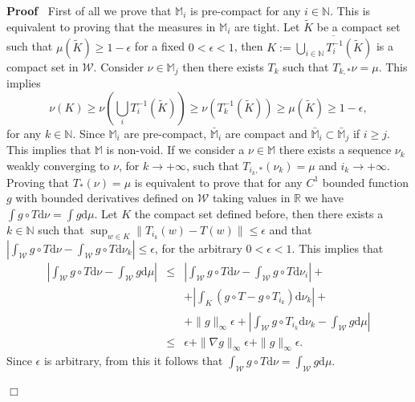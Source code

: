 \documentclass[a4paper,10pt]{article}
\newcommand{\assign}{:=}
\newcommand{\asterisk}{\mathord{*}}
\newcommand{\mathd}{\mathrm{d}}
\newenvironment{proof}{\noindent\textbf{Proof\ }}{\hspace*{\fill}$\Box$\medskip}
\begin{document}
\begin{proof}
  First of all we prove that $\mathbb{M}_i$ is pre-compact for any $i \in
  \mathbb{N}$. This is equivalent to proving that the measures in
  $\mathbb{M}_i$ are tight. Let $\tilde{K}$ be a compact set such that $\mu
  (\tilde{K}) \geqslant 1 - \epsilon$ for a fixed $0 < \epsilon < 1$, then $K
  \assign \overline{\bigcup_{i \in \mathbb{N}} T^{- 1}_i (\tilde{K})}$ is a
  compact set in $\mathcal{W}$. Consider $\nu \in \mathbb{M}_j$ then there
  exists $T_k$ such that $T_{k, \asterisk} \nu = \mu$. This implies
  \[ \nu (K) \geqslant \nu \left( \bigcup_i T^{- 1}_i (\tilde{K}) \right)
     \geqslant \nu (T^{- 1}_k (\tilde{K})) \geqslant \mu (\tilde{K}) \geqslant
     1 - \epsilon, \]
  for any $k \in \mathbb{N}$. Since $\mathbb{M}_i$ are pre-compact,
  $\bar{\mathbb{M}}_i$ are compact and $\bar{\mathbb{M}}_i \subset
  \bar{\mathbb{M}}_j$ if $i \geqslant j$. This implies that $\mathbb{M}$ is
  non-void. If we consider a $\nu \in \mathbb{M}$ there exists a sequence
  $\nu_k$ weakly converging to $\nu$, for $k \rightarrow + \infty$, such that
  $T_{i_k, \asterisk} (\nu_k) = \mu$ and $i_k \rightarrow + \infty$. Proving
  that $T_{\asterisk} (\nu) = \mu$ is equivalent to prove that for any $C^1$
  bounded function $g$ with bounded derivatives defined on $\mathcal{W}$
  taking values in $\mathbb{R}$ we have $\int g \circ T \mathd \nu = \int g
  \mathd \mu$. Let $K$ the compact set defined before, then there exists a $k
  \in \mathbb{N}$ such that $\sup_{w \in K} \| T_{i_k} (w) - T (w) \|
  \leqslant \epsilon$ and that $\left| \int_{\mathcal{W}} g \circ T \mathd \nu
  - \int_{\mathcal{W}} g \circ T \mathd \nu_k \right| \leqslant \epsilon$, for
  the arbitrary $0 < \epsilon < 1$. This implies that
  \begin{eqnarray}
    \left| \int_{\mathcal{W}} g \circ T \mathd \nu - \int_{\mathcal{W}} g
    \mathd \mu \right| & \leqslant & \left| \int_{\mathcal{W}} g \circ T
    \mathd \nu - \int_{\mathcal{W}} g \circ T \mathd \nu_i \right| +
    \nonumber\\
    &  & + \left| \int_K (g \circ T - g \circ T_{i_k}) \mathd \nu_k \right| +
    \nonumber\\
    &  & + \| g \|_{\infty} \epsilon + \left| \int_{\mathcal{W}} g \circ
    T_{i_k} \mathd \nu_k - \int_{\mathcal{W}} g \mathd \mu \right| \nonumber\\
    & \leqslant & \epsilon + \| \nabla g \|_{\infty} \epsilon + \| g
    \|_{\infty} \epsilon . \nonumber
  \end{eqnarray}
  Since $\epsilon$ is arbitrary, from this it follows that
  $\int_{\mathcal{W}} g \circ T \mathd \nu = \int_{\mathcal{W}} g \mathd \mu$.
  
\end{proof}
\end{document}

